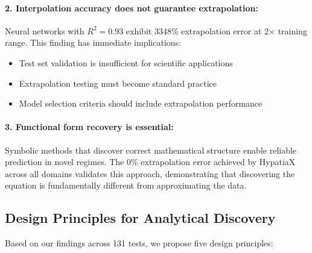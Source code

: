 \documentclass[twoside,11pt]{article}
\begin{document}
\paragraph{2. Interpolation accuracy does not guarantee extrapolation:}

Neural networks with $R^2 = 0.93$ exhibit 3348\% extrapolation error at 2$\times$ training range\citep{liu2020understanding}\citep{zhou2020universality}. This finding has immediate implications:
\begin{itemize}
\item Test set validation is insufficient for scientific applications\citep{virtanen2020scipy}
\item Extrapolation testing must become standard practice
\item Model selection criteria should include extrapolation performance
\end{itemize}

\paragraph{3. Functional form recovery is essential:}

Symbolic methods that discover correct mathematical structure enable reliable prediction in novel regimes. The 0\% extrapolation error achieved by HypatiaX across all domains validates this approach, demonstrating that discovering the equation is fundamentally different from approximating the data.

\subsection{Design Principles for Analytical Discovery}\citep{koza1994genetic}

Based on our findings across 131 tests, we propose five design principles:
\end{document}
